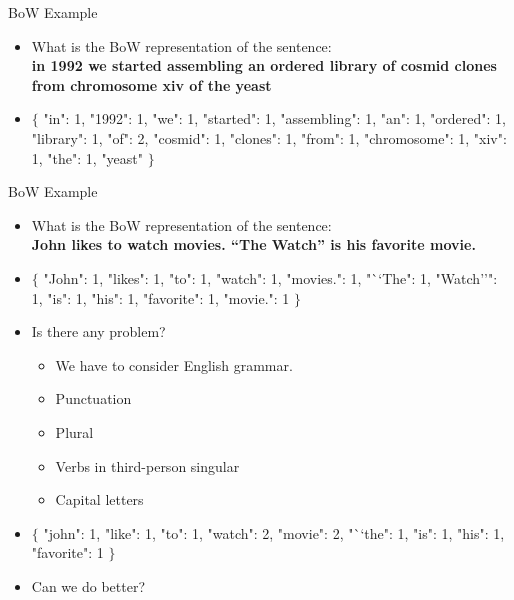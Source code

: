 \documentclass[aspectratio=169, 10pt]{beamer}
\begin{document}
\begin{frame}{BoW Example}
    \begin{itemize}
        \item What is the BoW representation of the sentence: \\
            \textbf{in 1992 we started assembling an ordered library of cosmid clones from chromosome xiv of the yeast}
        \pause
        \item $\{$ "in": 1, "1992": 1, "we": 1, "started": 1, "assembling": 1, "an": 1, "ordered": 1, "library": 1, "of": 2, "cosmid": 1, "clones": 1, "from": 1, "chromosome": 1, "xiv": 1, "the": 1, "yeast" $\}$
    \end{itemize}
\end{frame}

\begin{frame}{BoW Example}
    \begin{itemize}
        \item What is the BoW representation of the sentence: \\
            \textbf{John likes to watch movies. ``The Watch'' is his favorite movie.}
        \item $\{$ "John": 1, "likes": 1, "to": 1, "watch": 1, "movies.": 1, "``The": 1, "Watch''": 1, "is": 1, "his": 1, "favorite": 1, "movie.": 1 $\}$
        \item Is there any problem?
        \pause
            \begin{itemize}
                \item We have to consider English grammar.
                \item Punctuation
                \item Plural
                \item Verbs in third-person singular
                \item Capital letters
            \end{itemize}
        \pause
        \item $\{$ "john": 1, "like": 1, "to": 1, "watch": 2, "movie": 2, "``the": 1, "is": 1, "his": 1, "favorite": 1 $\}$
        \item Can we do better?
    \end{itemize}
    \end{frame}
\end{document}
